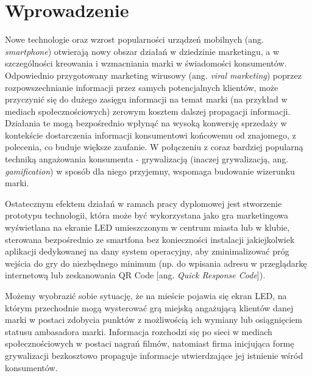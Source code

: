 \newpage
\section{Wprowadzenie}

Nowe technologie oraz wzrost popularności urządzeń mobilnych (ang. \emph{smartphone}) otwierają nowy obszar działań w dziedzinie marketingu, a w szczególności kreowania i wzmacniania marki w świadomości konsumentów. Odpowiednio przygotowany marketing wirusowy (ang. 
\emph{viral marketing}) poprzez rozpowszechnianie informacji przez samych potencjalnych klientów, może przyczynić się do dużego zasięgu informacji na temat marki (na przykład w mediach społecznościowych) zerowym kosztem dalszej propagacji informacji. Działania te mogą bezpośrednio wpłynąć na wysoką konwersję sprzedaży w kontekście dostarczenia informacji konsumentowi końcowemu od znajomego, z polecenia, co buduje większe zaufanie. W połączeniu z coraz bardziej popularną techniką angażowania konsumenta - grywalizacją (inaczej grywalizacją, ang. \emph{gamification}) w sposób dla niego przyjemny, wspomaga budowanie wizerunku marki.

Ostatecznym efektem działań w ramach pracy dyplomowej jest stworzenie prototypu technologii, która może być wykorzystana jako gra marketingowa wyświetlana na ekranie LED umieszczonym w centrum miasta lub w klubie, sterowana bezpośrednio ze smartfona bez konieczności instalacji jakiejkolwiek aplikacji dedykowanej na dany system operacyjny, aby zminimalizować próg wejścia do gry do niezbędnego minimum (np. do wpisania adresu w przeglądarkę internetową lub zeskanowania QR Code [ang. \emph{Quick Response Code}]).

Możemy wyobrazić sobie sytuację, że na mieście pojawia się ekran LED, na którym przechodnie mogą wysterować grą miejską angażującą klientów danej marki w postaci zdobycia punktów z możliwością ich wymiany lub osiągnięciem statusu ambasadora marki. Informacja rozchodzi się po sieci w mediach społecznościowych w postaci nagrań filmów, natomiast firma inicjująca formę grywalizacji bezkosztowo propaguje informacje utwierdzające jej istnienie wśród konsumentów.

